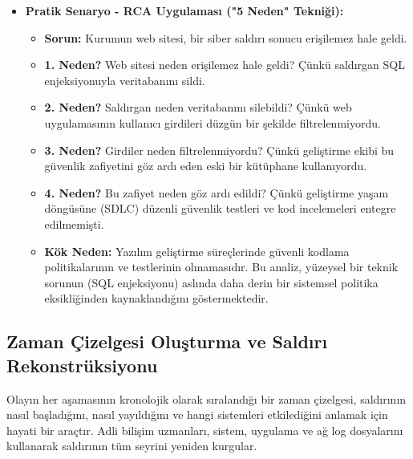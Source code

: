\begin{itemize}
\begin{itemize}
    \item \textbf{Pratik Senaryo - RCA Uygulaması ("5 Neden" Tekniği):}
    \begin{itemize}
        \item \textbf{Sorun:} Kurumun web sitesi, bir siber saldırı sonucu erişilemez hale geldi.
        \item \textbf{1. Neden?} Web sitesi neden erişilemez hale geldi? Çünkü saldırgan SQL enjeksiyonuyla veritabanını sildi.
        \item \textbf{2. Neden?} Saldırgan neden veritabanını silebildi? Çünkü web uygulamasının kullanıcı girdileri düzgün bir şekilde filtrelenmiyordu.
        \item \textbf{3. Neden?} Girdiler neden filtrelenmiyordu? Çünkü geliştirme ekibi bu güvenlik zafiyetini göz ardı eden eski bir kütüphane kullanıyordu.
        \item \textbf{4. Neden?} Bu zafiyet neden göz ardı edildi? Çünkü geliştirme yaşam döngüsüne (SDLC) düzenli güvenlik testleri ve kod incelemeleri entegre edilmemişti.
        \item \textbf{Kök Neden:} Yazılım geliştirme süreçlerinde güvenli kodlama politikalarının ve testlerinin olmamasıdır. Bu analiz, yüzeysel bir teknik sorunun (SQL enjeksiyonu) aslında daha derin bir sistemsel politika eksikliğinden kaynaklandığını göstermektedir.
    \end{itemize}
\end{itemize}

\subsection{Zaman Çizelgesi Oluşturma ve Saldırı Rekonstrüksiyonu}

Olayın her aşamasının kronolojik olarak sıralandığı bir zaman çizelgesi, saldırının nasıl başladığını, nasıl yayıldığını ve hangi sistemleri etkilediğini anlamak için hayati bir araçtır. Adli bilişim uzmanları, sistem, uygulama ve ağ log dosyalarını kullanarak saldırının tüm seyrini yeniden kurgular.


\end{itemize}
